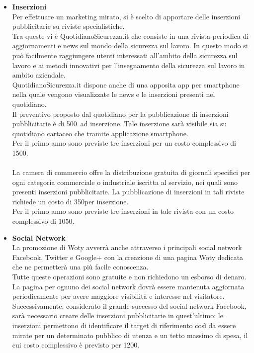 \begin{itemize}
\item \textbf{Inserzioni}\\
Per effettuare un marketing mirato, si è scelto di apportare delle inserzioni pubblicitarie su riviste specialistiche. \\
Tra queste vi è QuotidianoSicurezza.it che consiste in una rivista periodica di aggiornamenti e news sul mondo della sicurezza sul lavoro. In questo modo si può facilmente raggiungere utenti interessati all'ambito della sicurezza sul lavoro e ai metodi innovativi per l'insegnamento della sicurezza sul lavoro in ambito aziendale.\\
QuotidianoSicurezza.it dispone anche di una apposita app per smartphone nella quale vengono visualizzate le news e le inserzioni presenti nel quotidiano.\\
Il preventivo proposto dal quotidiano per la pubblicazione di inserzioni pubblicitarie è di 500\EUR\ ad inserzione. Tale inserzione sarà visibile sia su quotidiano cartaceo che tramite applicazione smartphone.\\ Per il primo anno sono previste tre inserzioni per un costo complessivo di 1500\EUR.\\
\\
La camera di commercio offre la distribuzione gratuita di giornali specifici per ogni categoria commerciale o industriale iscritta al servizio, nei quali sono presenti inserzioni pubblicitarie. La pubblicazione di inserzioni in tali riviste richiede un costo di 350\EUR per inserzione.\\
Per il primo anno sono previste tre inserzioni in tale rivista con un costo complessivo di 1050\EUR.

\item \textbf{Social Network}\\
La promozione di Woty avverrà anche attraverso i principali social network Facebook, Twitter e Google+ con la creazione di una pagina Woty dedicata che ne permetterà una più facile conoscenza.\\
Tutte queste operazioni sono gratuite e non richiedono un esborso di denaro.\\
La pagina per ognuno dei social network dovrà essere mantenuta aggiornata periodicamente per avere maggiore visibilità e interesse nel visitatore.\\
Successivamente, considerato il grande successo del social network Facebook, sarà necessario creare delle inserzioni pubblicitarie in quest'ultimo; le inserzioni permettono di identificare il target di riferimento così da essere mirate per un determinato pubblico di utenza e un tetto massimo di spesa, il cui costo complessivo è previsto per 1200\EUR.


\end{itemize}
